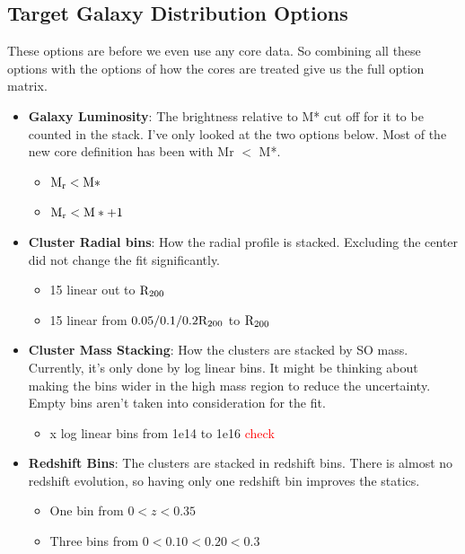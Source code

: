 \documentclass[twocolumn]{article}
\newcommand\mynotes[1]{\textcolor{red}{#1}}
\begin{document}
\subsection{Target Galaxy Distribution Options}
These options are before we even use any core data. So combining all
these options with the options of how the cores are treated give us
the full option matrix.
\begin{itemize}
  
\item \textbf{Galaxy Luminosity}: The brightness relative to M* cut
  off for it to be counted in the stack. I've only looked at the two
  options below.  Most of the new core definition has been with Mr $<$
  M*.

  \begin{itemize}
    \item $\rm{M_{r} < M* }$
    \item $\rm{M_{r} < M*+1}$
  \end{itemize}
\item \textbf{Cluster Radial bins}: How the radial profile is
  stacked. Excluding the center did not change the fit significantly.
  \begin{itemize}
    \item 15 linear out to $\rm{R_{200}}$
    \item 15 linear from $0.05/0.1/0.2\rm{R_{200}}$ to $\rm{R_{200}}$
  \end{itemize}
\item \textbf{Cluster Mass Stacking}: How the clusters are stacked by
  SO mass. Currently, it's only done by log linear bins. It might be
  thinking about making the bins wider in the high mass region to
  reduce the uncertainty. Empty bins aren't taken into consideration
  for the fit.
  \begin{itemize}
    \item x log linear bins from 1e14 to 1e16 \mynotes{check}
  \end{itemize}
  
\item \textbf{Redshift Bins}: The clusters are stacked in redshift
  bins. There is almost no redshift evolution, so having only one
  redshift bin improves the statics.
  \begin{itemize}
    \item One bin from $0<z<0.35$
    \item Three bins from $0<0.10<0.20<0.3$
  \end{itemize}
\end{itemize}
\end{document}
